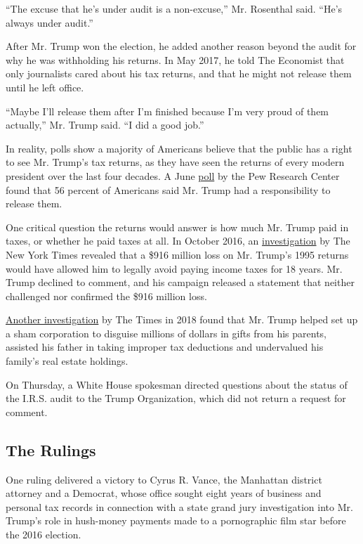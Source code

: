 ``The excuse that he's under audit is a non-excuse,'' Mr. Rosenthal
said. ``He's always under audit.''

After Mr. Trump won the election, he added another reason beyond the
audit for why he was withholding his returns. In May 2017, he told The
Economist that only journalists cared about his tax returns, and that he
might not release them until he left office.

``Maybe I'll release them after I'm finished because I'm very proud of
them actually,'' Mr. Trump said. ``I did a good job.''

In reality, polls show a majority of Americans believe that the public
has a right to see Mr. Trump's tax returns, as they have seen the
returns of every modern president over the last four decades. A June
\href{https://www.pewresearch.org/politics/2020/06/30/publics-mood-turns-grim-trump-trails-biden-on-most-personal-traits-major-issues/}{poll}
by the Pew Research Center found that 56 percent of Americans said Mr.
Trump had a responsibility to release them.

One critical question the returns would answer is how much Mr. Trump
paid in taxes, or whether he paid taxes at all. In October 2016, an
\href{https://www.nytimes3xbfgragh.onion/2016/10/02/us/politics/donald-trump-taxes.html}{investigation}
by The New York Times revealed that a \$916 million loss on Mr. Trump's
1995 returns would have allowed him to legally avoid paying income taxes
for 18 years. Mr. Trump declined to comment, and his campaign released a
statement that neither challenged nor confirmed the \$916 million loss.

\href{https://www.nytimes3xbfgragh.onion/interactive/2018/10/02/us/politics/donald-trump-tax-schemes-fred-trump.html}{Another
investigation} by The Times in 2018 found that Mr. Trump helped set up a
sham corporation to disguise millions of dollars in gifts from his
parents, assisted his father in taking improper tax deductions and
undervalued his family's real estate holdings.

On Thursday, a White House spokesman directed questions about the status
of the I.R.S. audit to the Trump Organization, which did not return a
request for comment.

\hypertarget{the-rulings}{%
\subsection{The Rulings}\label{the-rulings}}

One ruling delivered a victory to Cyrus R. Vance, the Manhattan district
attorney and a Democrat, whose office sought eight years of business and
personal tax records in connection with a state grand jury investigation
into Mr. Trump's role in hush-money payments made to a pornographic film
star before the 2016 election.

